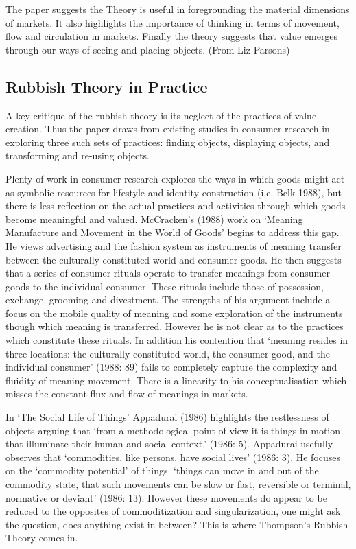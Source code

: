 \documentclass[12pt]{article}
\begin{document}
The paper suggests the Theory is useful in foregrounding the material dimensions of markets. It also highlights the importance of thinking in terms of movement, flow and circulation in markets. Finally the theory suggests that value emerges through our ways of seeing and placing objects. (From Liz Parsons)

\subsection{Rubbish Theory in Practice}
A key critique of the rubbish theory is its neglect of the practices of value creation. Thus the paper draws from existing studies in consumer research in exploring three such sets of practices: finding objects, displaying objects, and transforming and re-using objects.

Plenty of work in consumer research explores the ways in which goods might act as symbolic resources for lifestyle and identity construction (i.e. Belk 1988), but there is less reflection on the actual practices and activities through which goods become meaningful and valued. McCracken’s (1988) work on ‘Meaning Manufacture and Movement in the World of Goods’ begins to address this gap. He views advertising and the fashion system as instruments of meaning transfer between the culturally constituted world and consumer goods. He then suggests that a series of consumer rituals operate to transfer meanings from consumer goods to the individual consumer. These rituals include those of possession, exchange, grooming and divestment. The strengths of his argument include a focus on the mobile quality of meaning and some exploration of the instruments though which meaning is transferred. However he is not clear as to the practices which constitute these rituals. In addition his contention that ‘meaning resides in three locations: the culturally constituted world, the consumer good, and the individual consumer’ (1988: 89) fails to completely capture the complexity and fluidity of meaning movement. There is a linearity to his conceptualisation which misses the constant flux and flow of meanings in markets.

In ‘The Social Life of Things’ Appadurai (1986) highlights the restlessness of objects arguing that ‘from a methodological point of view it is things-in-motion that illuminate their human and social context.’ (1986: 5). Appadurai usefully observes that ‘commodities, like persons, have social lives’ (1986: 3). He focuses on the ‘commodity potential’ of things. ‘things can move in and out of the commodity state, that such movements can be slow or fast, reversible or terminal, normative or deviant’ (1986: 13). However these movements do appear to be reduced to the opposites of commoditization and singularization, one might ask the question, does anything exist in-between? This is where Thompson’s Rubbish Theory comes in.
\end{document}
